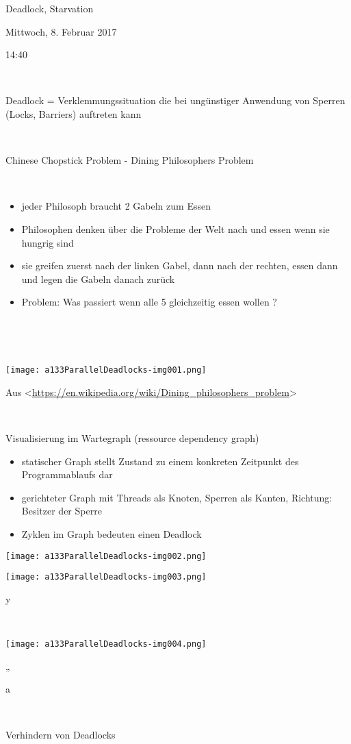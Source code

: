 Deadlock, Starvation

Mittwoch, 8. Februar 2017

14:40

~

Deadlock = Verklemmungssituation die bei ungünstiger Anwendung von Sperren (Locks, Barriers) auftreten kann

~

Chinese Chopstick Problem - Dining Philosophers Problem

~

\begin{itemize}
\item jeder Philosoph braucht 2 Gabeln zum Essen
\item Philosophen denken über die Probleme der Welt nach und essen wenn sie hungrig sind
\item sie greifen zuerst nach der linken Gabel, dann nach der rechten, essen dann und legen die Gabeln danach zurück
\item Problem: Was passiert wenn alle 5 gleichzeitig essen wollen ? 
\end{itemize}
~

~

 \texttt{[image: a133ParallelDeadlocks-img001.png]} 

Aus {\textless}\url{https://en.wikipedia.org/wiki/Dining_philosophers_problem}{\textgreater} 

~

Visualisierung im Wartegraph (ressource dependency graph)

\begin{itemize}
\item statischer Graph stellt Zustand zu einem konkreten Zeitpunkt des Programmablaufs dar
\item gerichteter Graph mit Threads als Knoten, Sperren als Kanten, Richtung: Besitzer der Sperre
\item Zyklen im Graph bedeuten einen Deadlock
\end{itemize}
 \texttt{[image: a133ParallelDeadlocks-img002.png]} 

 \texttt{[image: a133ParallelDeadlocks-img003.png]} 

y

~

 \texttt{[image: a133ParallelDeadlocks-img004.png]} 

„

a

~

Verhindern von Deadlocks

